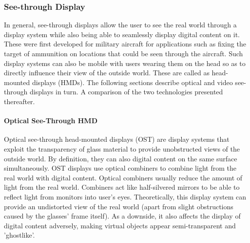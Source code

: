 \subsubsection{See-through Display}
In general, see-through displays allow the user to see the real world through a display system while also being able to seamlessly display digital content on it. These were first developed for military aircraft for applications such as fixing the target of ammunition on locations that could be seen through the aircraft. Such display systems can also be mobile with users wearing them on the head so as to directly influence their view of the outside world. These are called as head-mounted displays (HMDs). The following sections describe optical and video see-through displays in turn. A comparison of the two technologies presented thereafter.


\paragraph{Optical See-Through HMD}
Optical see-through head-mounted displays (OST) are display systems that exploit the transparency of glass material to provide unobstructed views of the outside world. By definition, they can also digital content on the same surface simultaneously. OST displays use optical combiners to combine light from the real world with digital content. Optical combiners usually reduce the amount of light from the real world. Combiners act like half-silvered mirrors to be able to reflect light from monitors into user's eyes. Theoretically, this display system can provide an undistorted view of the real world (apart from slight obstructions caused by the glasses' frame itself). As a downside, it also affects the display of digital content adversely, making virtual objects appear semi-transparent and 'ghostlike'.


